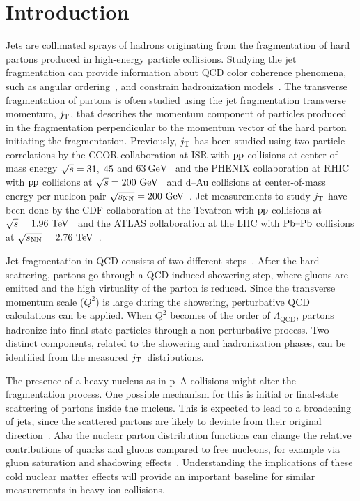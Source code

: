 \linenumbers

\section{Introduction}
\label{sec:introduction}

Jets are collimated sprays of hadrons originating from the fragmentation of hard partons produced in high-energy particle collisions. Studying the jet fragmentation can provide information about QCD color coherence phenomena, such as angular ordering~\cite{basicsofpqcd}, and constrain hadronization models~\cite{introPythia81,herwigManual,herwig7releaseNote}. The transverse fragmentation of partons is often studied using the jet fragmentation transverse momentum, $\jt{}$, that describes the momentum component of particles produced in the fragmentation perpendicular to the momentum vector of the hard parton initiating the fragmentation. Previously, $\jt{}$ has been studied using two-particle correlations by the CCOR collaboration at ISR with $\pp$ collisions at center-of-mass energy $\sqrtS = 31,\;45$ and $63~\mathrm{GeV}$~\cite{firstjtmeasurement} and the PHENIX collaboration at RHIC with $\pp$ collisions at $\sqrtSE[GeV]{200}$~\cite{PHENIXjets} and d--Au collisions at center-of-mass energy per nucleon pair $\sqrtSnnE[GeV]{200}$~\cite{phenixJtPAu}. Jet measurements to study $\jt{}$ have been done by the CDF collaboration at the Tevatron with $\ppbar$ collisions at $\sqrtSE{1.96}$~\cite{cdfpaper} and the ATLAS collaboration at the LHC with $\PbPb$ collisions at $\sqrtSnnE{2.76}$~\cite{atlaksenJetit}.

Jet fragmentation in QCD consists of two different steps~\cite{eventGenerators}. After the hard scattering, partons go through a QCD induced showering step, where gluons are emitted and the high virtuality  of the parton is reduced. Since the transverse momentum scale ($Q^{2}$) is large during the showering, perturbative QCD calculations can be applied. When $Q^{2}$ becomes of the order of $\Lambda_{\mathrm{QCD}}$, partons hadronize into final-state particles through a non-perturbative process. Two distinct components, related to the showering and hadronization phases, can be identified from the measured $\jt{}$~distributions.

The presence of a heavy nucleus as in p--A collisions might alter the fragmentation process. One possible mechanism for this is initial or final-state scattering of partons inside the nucleus. This is expected to lead to a broadening of jets, since the scattered partons are likely to deviate from their original direction~\cite{jetBroadeningPpb1}. Also the nuclear parton distribution functions can change the relative contributions of quarks and gluons compared to free nucleons, for example via gluon saturation and shadowing effects~\cite{introCgc,eps09}. Understanding the implications of these cold nuclear matter effects will provide an important baseline for similar measurements in heavy-ion collisions.


